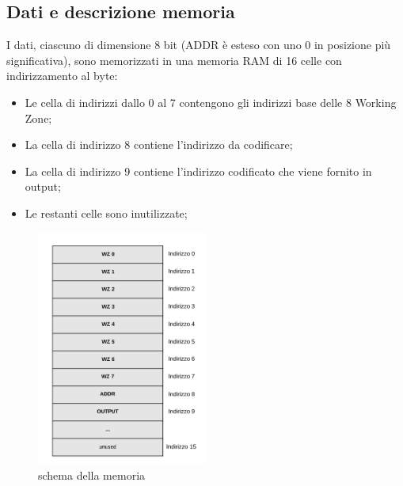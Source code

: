 \documentclass{article}
\begin{document}
\subsection{Dati e descrizione memoria}
I dati, ciascuno di dimensione 8 bit (ADDR è esteso con uno 0 in posizione più significativa), sono memorizzati in una memoria RAM di 16 celle con indirizzamento al byte:
\begin{itemize}
\item Le cella di indirizzi dallo 0 al 7 contengono gli indirizzi base delle 8 Working Zone;
\item La cella di indirizzo 8 contiene l'indirizzo da codificare;
\item La cella di indirizzo 9 contiene l'indirizzo codificato che viene fornito in output;
\item Le restanti celle sono inutilizzate;
\end{itemize}
\begin{figure}[h]
    \centering
    \includegraphics[width=0.5\textwidth]{memoria}
    \caption{schema della memoria}
\end{figure}
\pagebreak
\end{document}
